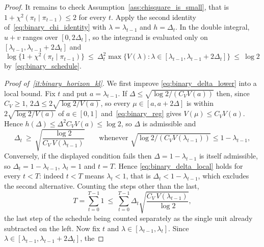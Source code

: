 \documentclass[aos]{imsart}%
\theoremstyle{plain}
\theoremstyle{definition}
\begin{document}
\begin{proof}
        It remains to check Assumption~\ref{ass:chisquare_is_small}, that is
        $1+\chi^{2}(\pi_t\mid\pi_{t-1})\leq2$ for every $t$. Apply the second
        identity of~\eqref{eq:binary_chi_identity} with $\lambda=\lambda_{t-1}$
        and $h=\Delta_t$. In the double integral, $u+v$ ranges over
        $[0,2\Delta_t]$, so the integrand is evaluated only on
        $[\lambda_{t-1},\lambda_{t-1}+2\Delta_t]$ and
        \begin{equation*}
            \log\bigl\{1+\chi^{2}(\pi_t\mid\pi_{t-1})\bigr\}
            \ \leq\ \Delta_t^{2}
            \max\bigl\{V(\lambda):\lambda\in[\lambda_{t-1},
            \lambda_{t-1}+2\Delta_t]\bigr\}\ \leq\ \log2
        \end{equation*}
        by~\eqref{eq:binary_schedule}.

        \emph{Proof of~\ref{it:binary_horizon_kl}.} We first improve
        \eqref{eq:binary_delta_lower} into a local bound. Fix $t$ and put
        $a=\lambda_{t-1}$. If $\Delta\leq\sqrt{\log2/(C_VV(a))}$ then, since
        $C_V\geq1$, $2\Delta\leq2\sqrt{\log2/V(a)}$, so every
        $\mu\in[a,a+2\Delta]$ is within $2\sqrt{\log2/V(a)}$ of $a\in[0,1]$
        and~\eqref{eq:binary_reg} gives $V(\mu)\leq C_VV(a)$. Hence
        $h(\Delta)\leq\Delta^{2}C_VV(a)\leq\log2$, so $\Delta$ is admissible
        and
        \begin{equation}
            \label{eq:binary_delta_local}
            \Delta_t\ \geq\ \sqrt{\frac{\log2}{C_V\,V(\lambda_{t-1})}}
            \qquad\text{whenever }
            \sqrt{\log2/(C_VV(\lambda_{t-1}))}\leq1-\lambda_{t-1},
        \end{equation}
        Conversely, if the displayed condition fails then
        $\Delta=1-\lambda_{t-1}$ is itself admissible, so
        $\Delta_t=1-\lambda_{t-1}$, $\lambda_t=1$ and $t=T$. Hence
        \eqref{eq:binary_delta_local} holds for every $t<T$: indeed $t<T$
        means $\lambda_t<1$, that is $\Delta_t<1-\lambda_{t-1}$, which excludes
        the second alternative. Counting the steps other than the last,
        \begin{equation}
            \label{eq:binary_count}
            T=\sum_{t=0}^{T-1}1
            \ \leq\ \sum_{t=0}^{T-1}\Delta_t
            \sqrt{\frac{C_V\,V(\lambda_{t-1})}{\log2}} ,
        \end{equation}
        the last step of the schedule being counted separately as the single
        unit already subtracted on the left.
        Now fix $t$ and $\lambda\in[\lambda_{t-1},\lambda_t]$. Since
        $\lambda\in[\lambda_{t-1},\lambda_{t-1}+2\Delta_t]$, the

\end{proof}
\end{document}
